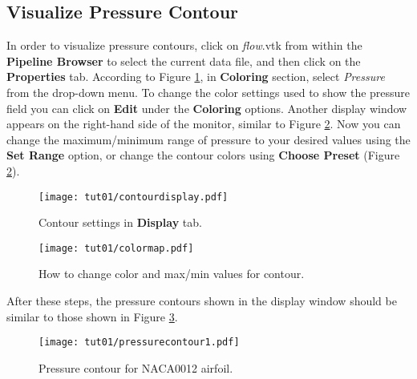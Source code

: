 \subsection{Visualize Pressure Contour}
In order to visualize pressure contours, click on \textit{flow}.vtk from within the \textbf{Pipeline Browser} to select the current data file, and then click on the \textbf{Properties} tab. According to Figure \ref{fig1:colorby}, in \textbf{Coloring} section, select \textit{Pressure} from the drop-down menu. To change the color settings used to show the pressure field you can click on \textbf{Edit} under the \textbf{Coloring} options. Another display window appears on the right-hand side of the monitor, similar to Figure \ref{fig1:change_color_range}. Now you can change the maximum/minimum range of pressure to your desired values using the \textbf{Set Range} option, or change the contour colors using \textbf{Choose Preset} (Figure \ref{fig1:change_color_range}).
\begin{figure}[htbp]
    \centering
    \texttt{[image: tut01/contourdisplay.pdf]}
    \caption{Contour settings in \textbf{Display} tab.}
    \label{fig1:colorby}
\end{figure}
\begin{figure}[htbp]
    \centering
    \texttt{[image: tut01/colormap.pdf]}
    \caption{How to change color and max/min values for contour.}
    \label{fig1:change_color_range}
\end{figure}
After these steps, the pressure contours shown in the display window should be similar to those shown in Figure \ref{fig1:pressure_contour}.
\begin{figure}[htbp]
    \centering
    \texttt{[image: tut01/pressurecontour1.pdf]}
    \caption{Pressure contour for NACA0012 airfoil.}
    \label{fig1:pressure_contour}
\end{figure}

